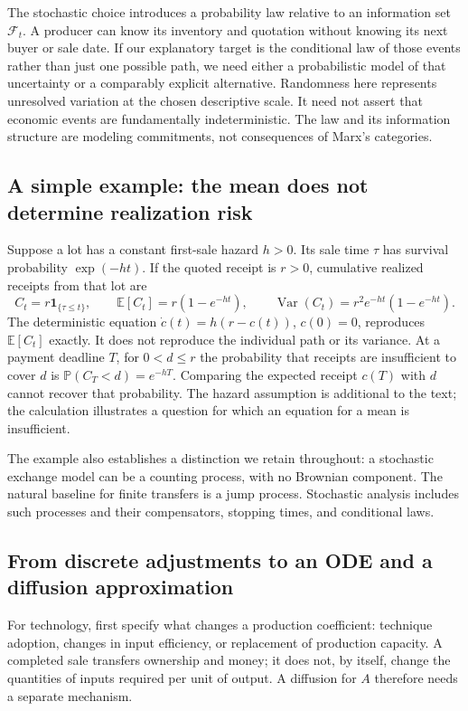 \documentclass[11pt,letterpaper]{article}
\newcommand{\E}{\mathbb E}
\newcommand{\Pp}{\mathbb P}
\newcommand{\F}{\mathcal F}
\newcommand{\ind}{\mathbf 1}
\begin{document}
The stochastic choice introduces a probability law relative to an
information set $\F_t$. A producer can know its inventory and quotation
without knowing its next buyer or sale date. If our explanatory target is
the conditional law of those events rather than just one possible path,
we need either a probabilistic model of that uncertainty or a comparably
explicit alternative. Randomness here represents unresolved variation
at the chosen descriptive scale. It need not assert that economic events
are fundamentally indeterministic. The law and its information structure
are modeling commitments, not consequences of Marx's categories.

\subsection{A simple example: the mean does not determine realization risk}
Suppose a lot has a constant first-sale hazard $h>0$. Its sale time
$\tau$ has survival probability $\exp(-ht)$. If the quoted receipt is
$r>0$, cumulative realized receipts from that lot are
\[
 C_t=r\ind_{\{\tau\le t\}},\qquad
 \E[C_t]=r(1-e^{-ht}),\qquad
 \operatorname{Var}(C_t)=r^2e^{-ht}(1-e^{-ht}).
\]
The deterministic equation
$\dot c(t)=h(r-c(t))$, $c(0)=0$, reproduces $\E[C_t]$ exactly.
It does not reproduce the individual path or its variance. At a payment
deadline $T$, for $0<d\le r$ the probability that receipts are insufficient
to cover $d$ is $\Pp(C_T<d)=e^{-hT}$. Comparing the expected receipt
$c(T)$ with $d$ cannot recover that probability. The hazard assumption is
additional to the text; the calculation illustrates a question for which
an equation for a mean is insufficient.

The example also establishes a distinction we retain throughout:
a stochastic exchange model can be a counting process, with no Brownian
component. The natural baseline for finite transfers is a jump process.
Stochastic analysis includes such processes and their compensators,
stopping times, and conditional laws.

\subsection{From discrete adjustments to an ODE and a diffusion approximation}
For technology, first specify what changes a production coefficient:
technique adoption, changes in input efficiency, or replacement of
production capacity. A completed sale transfers ownership and money; it
does not, by itself, change the quantities of inputs required per unit
of output. A diffusion for $A$ therefore needs a separate mechanism.
\end{document}
